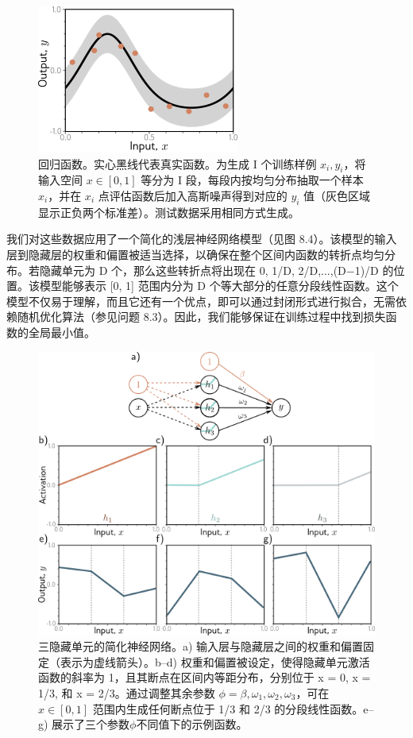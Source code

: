\begin{figure}[ht!]
\centering
\includegraphics[width=0.7\linewidth]{png/chapter8/PerfDataSet.png}
\caption{回归函数。实心黑线代表真实函数。为生成 I 个训练样例 \({x_i,y_i}\)，将输入空间 \(x \in [0,1]\) 等分为 I 段，每段内按均匀分布抽取一个样本 \(x_i\)，并在 \(x_i\) 点评估函数后加入高斯噪声得到对应的 \(y_i\) 值（灰色区域显示正负两个标准差）。测试数据采用相同方式生成。}
\end{figure}


我们对这些数据应用了一个简化的浅层神经网络模型（见图 8.4）。该模型的输入层到隐藏层的权重和偏置被适当选择，以确保在整个区间内函数的转折点均匀分布。若隐藏单元为 D 个，那么这些转折点将出现在 0, 1/D, 2/D,...,(D−1)/D 的位置。该模型能够表示 [0, 1] 范围内分为 D 个等大部分的任意分段线性函数。这个模型不仅易于理解，而且它还有一个优点，即可以通过封闭形式进行拟合，无需依赖随机优化算法（参见问题 8.3）。因此，我们能够保证在训练过程中找到损失函数的全局最小值。

\begin{figure}[ht!]
\centering
\includegraphics[width=0.7\linewidth]{png/chapter8/PerfModel.png}
\caption{三隐藏单元的简化神经网络。a) 输入层与隐藏层之间的权重和偏置固定（表示为虚线箭头）。b–d) 权重和偏置被设定，使得隐藏单元激活函数的斜率为 1，且其断点在区间内等距分布，分别位于 x = 0, x = 1/3, 和 x = 2/3。通过调整其余参数 \(\phi = {\beta, \omega_1, \omega_2, \omega_3}\)，可在 \(x \in [0,1]\) 范围内生成任何断点位于 1/3 和 2/3 的分段线性函数。e–g) 展示了三个参数\(\phi\)不同值下的示例函数。}
\end{figure}

